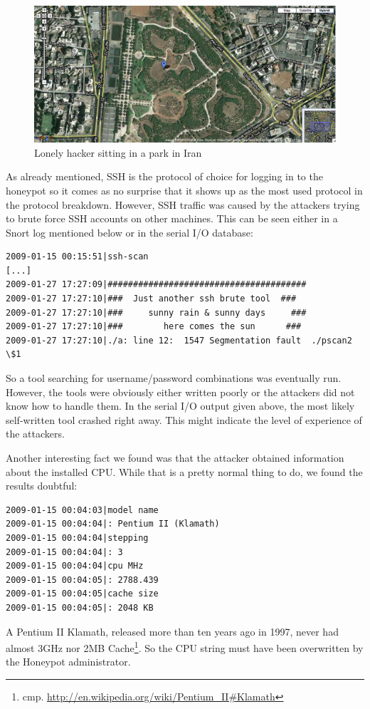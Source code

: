 \documentclass[a4paper,
    11pt,
    normalheadings,
    parindent,
    UKenglish,
    abstracton,
    ]{scrartcl}
\begin{document}
\begin{figure}
    \begin{center}\includegraphics[width=\textwidth]{bin/ssh-geoip-iran.png}\end{center}
    \caption{Lonely hacker sitting in a park in Iran}
    \label{pic:iranian-hacker}
\end{figure}


As already mentioned, SSH is the protocol of choice for logging in to the honeypot so it comes as no surprise that it shows up as the most used protocol in the protocol breakdown.
However, SSH traffic was caused by the attackers trying to brute force SSH accounts on other machines.
This can be seen either in a Snort log mentioned below or in the serial I/O database:

\begin{verbatim}
2009-01-15 00:15:51|ssh-scan
[...]
2009-01-27 17:27:09|#######################################
2009-01-27 17:27:10|###  Just another ssh brute tool  ###
2009-01-27 17:27:10|###     sunny rain & sunny days     ###
2009-01-27 17:27:10|###        here comes the sun      ###
2009-01-27 17:27:10|./a: line 12:  1547 Segmentation fault  ./pscan2 \$1
\end{verbatim}
So a tool searching for username/password combinations was eventually run.
However, the tools were obviously either written poorly or the attackers did not know how to handle them.
In the serial I/O output given above, the most likely self-written tool crashed right away.
This might indicate the level of experience of the attackers.






Another interesting fact we found was that the attacker obtained information about the installed CPU.
While that is a pretty normal thing to do, we found the results doubtful:
\begin{verbatim}
2009-01-15 00:04:03|model name
2009-01-15 00:04:04|: Pentium II (Klamath)
2009-01-15 00:04:04|stepping
2009-01-15 00:04:04|: 3
2009-01-15 00:04:04|cpu MHz
2009-01-15 00:04:05|: 2788.439
2009-01-15 00:04:05|cache size
2009-01-15 00:04:05|: 2048 KB
\end{verbatim}
A Pentium II Klamath, released more than ten years ago in 1997, never had almost 3GHz nor 2MB Cache\footnote{cmp. \url{http://en.wikipedia.org/wiki/Pentium_II\#Klamath}}.
So the CPU string must have been overwritten by the Honeypot administrator.
\end{document}
